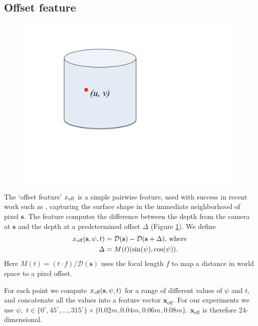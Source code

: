\documentclass[10pt,twocolumn,letterpaper]{article}
\newcommand{\degree}{^{\circ}}
\newcommand{\feat}{\mathbf{x}}
\newcommand{\rgbdimage}{\mathcal{D}}
\newcommand{\pixelidx}{\mathbf{s}}
\begin{document}
\subsection{Offset feature}
\pagedepth\maxdimen
\begin{figure}
  \vspace{-20pt}
  \centering
    \includegraphics[width=0.35\columnwidth, clip=true, trim=130 210 340 80, page=9]{spider_cobweb}
    \vspace{-10pt}
  \caption{}%
    \label{fig:offset_feature}
\end{figure}
The `offset feature' $x_\text{off}$ is a simple pairwise feature, used with success in recent work such as \cite{shotton-cvpr-2011}, capturing the surface shape in the immediate neighborhood of pixel $\pixelidx$.
The feature computes the difference between the depth from the camera at $\pixelidx$ and the depth at a predetermined offset $\Delta$ (Figure \ref{fig:offset_feature}). We define
\begin{align}
\scalfeat_\text{off} (\pixelidx, \psi, t) &= \rgbdimage(\pixelidx) - \rgbdimage(\pixelidx + \Delta), \, \text{where} \\
\Delta &= M(t) (\sin(\psi), \cos(\psi)).
\end{align}
Here $M(t) = (t\cdotp f)/\rgbdimage(\pixelidx)$ uses the focal length $f$ to map a distance in world space to a pixel offset. 

For each point we compute $\scalfeat_\text{off} (\pixelidx, \psi, t)$ for a range of different values of $\psi$ and $t$, and concatenate all the values into a feature vector $\feat_{\text{off}}$.
For our experiments we use $\psi, \,\, t \in \{0\degree, 45\degree, \ldots, 315\degree\} \times \{0.02m, 0.04m, 0.06m, 0.08m\}$.
$\feat_{\text{off}}$ is therefore 24-dimensional.

\end{document}
